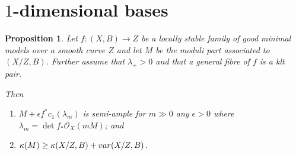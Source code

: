 \documentclass[12pt]{amsart}
\theoremstyle{plain}
\newtheorem{proposition}[theorem]{Proposition}
\theoremstyle{definition}
\def\det{\operatorname{det}}
\def\rar{\rightarrow}
\begin{document}




\section{$1$-dimensional bases}


\begin{proposition}
\label{prop_lambda_plus}
Let $f \colon (X,B) \rar Z$ be a locally stable family of good minimal models over a smooth curve $Z$
and let $M$ be the moduli part associated to $(X/Z, B)$.
Further assume  
that $\lambda_+>0$ and that a general fibre of $f$ is a klt pair.

Then
\begin{enumerate}
\item $M+\epsilon f^*c_1(\lambda_m)$ is semi-ample for $m\gg 0$ any $\epsilon > 0$
where $\lambda_m = \det f_*\mathcal O_X(mM)$; and

\item $\kappa(M) \geq \kappa(X/Z, B)+{\rm var}(X/Z, B)$.
\end{enumerate}
\end{proposition}
\end{document}
